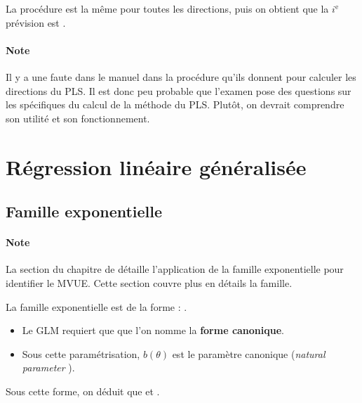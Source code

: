 \documentclass[french]{article}
\begin{document}
\begin{multicols*}{2}
\begin{definitionNOHFILLsub}[Coefficients]
\bigskip

La procédure est la même pour toutes les directions, puis on obtient que la $i^{\text{e}}$ prévision est .
\end{definitionNOHFILLsub}

\paragraph{Note}	Il y a une faute dans le manuel dans la procédure qu'ils donnent pour calculer les directions du PLS. Il est donc peu probable que l'examen pose des questions sur les spécifiques du calcul de la méthode du PLS. Plutôt, on devrait comprendre son utilité et son fonctionnement.



\newpage
\section{Régression linéaire généralisée}\label{sec:GLM}

\subsection{Famille exponentielle}\label{subsec:ExpFamRegr}
\paragraph{Note}	La section \underline{\textit{}} du chapitre de \underline{\textit{}} détaille l'application de la famille exponentielle pour identifier le MVUE. Cette section couvre plus en détails la famille.

\bigskip

La famille exponentielle est de la forme : .
\begin{itemize}
	\item	Le GLM requiert que  que l'on nomme la \textbf{forme canonique}.
	\item	Sous cette paramétrisation, $b(\theta)$ est le paramètre canonique (\og \textit{natural parameter} \fg{}).
\end{itemize}

Sous cette forme, on déduit que  et .


\end{multicols*}
\end{document}
